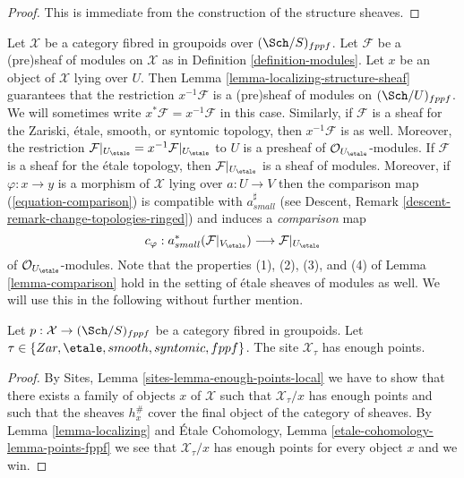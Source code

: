 \begin{proof}
This is immediate from the construction of the structure sheaves.
\end{proof}

\noindent
Let $\mathcal{X}$ be a category fibred in groupoids over $(\Sch/S)_{fppf}$.
Let $\mathcal{F}$ be a (pre)sheaf of modules on $\mathcal{X}$ as in
Definition \ref{definition-modules}.
Let $x$ be an object of $\mathcal{X}$ lying over $U$. Then
Lemma \ref{lemma-localizing-structure-sheaf}
guarantees that the restriction
$x^{-1}\mathcal{F}$ is a (pre)sheaf of modules on $(\Sch/U)_{fppf}$.
We will sometimes write $x^*\mathcal{F} = x^{-1}\mathcal{F}$ in this case.
Similarly, if $\mathcal{F}$ is a sheaf for the Zariski, \'etale, smooth,
or syntomic topology, then $x^{-1}\mathcal{F}$ is as well. Moreover, the
restriction
$\mathcal{F}|_{U_\etale} = x^{-1}\mathcal{F}|_{U_\etale}$
to $U$ is a presheaf of $\mathcal{O}_{U_\etale}$-modules.
If $\mathcal{F}$ is a sheaf for the \'etale topology, then
$\mathcal{F}|_{U_\etale}$ is a sheaf of modules. Moreover,
if $\varphi : x \to y$ is a morphism of $\mathcal{X}$ lying over
$a : U \to V$ then the comparison map (\ref{equation-comparison})
is compatible with $a_{small}^\sharp$ (see
Descent, Remark \ref{descent-remark-change-topologies-ringed})
and induces a {\it comparison} map
\begin{equation}
\label{equation-comparison-modules}
c_\varphi : a_{small}^*(\mathcal{F}|_{V_\etale})
\longrightarrow
\mathcal{F}|_{U_\etale}
\end{equation}
of $\mathcal{O}_{U_\etale}$-modules.
Note that the properties (1), (2), (3), and (4) of
Lemma \ref{lemma-comparison}
hold in the setting of \'etale sheaves of modules as well.
We will use this in the following without further mention.

\begin{lemma}
\label{lemma-enough-points}
Let $p : \mathcal{X} \to (\Sch/S)_{fppf}$ be a category fibred
in groupoids. Let $\tau \in \{Zar, \etale, smooth, syntomic, fppf\}$.
The site $\mathcal{X}_\tau$ has enough points.
\end{lemma}

\begin{proof}
By
Sites, Lemma \ref{sites-lemma-enough-points-local}
we have to show that there exists a family of objects $x$ of $\mathcal{X}$
such that $\mathcal{X}_\tau/x$ has enough points and such that the sheaves
$h_x^\#$ cover the final object of the category of sheaves.
By
Lemma \ref{lemma-localizing}
and
\'Etale Cohomology, Lemma \ref{etale-cohomology-lemma-points-fppf}
we see that $\mathcal{X}_\tau/x$ has enough points for every object
$x$ and we win.
\end{proof}







